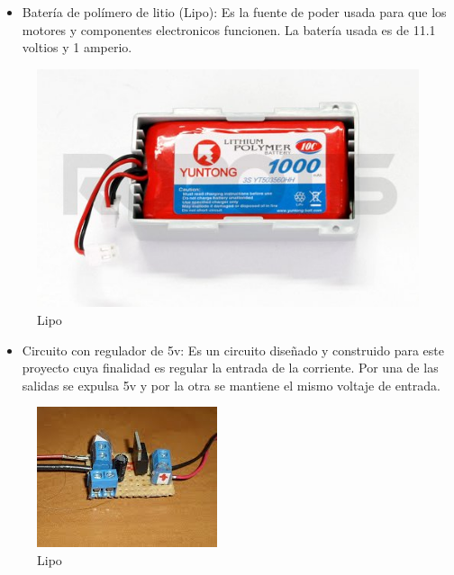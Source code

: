 \begin{itemize}
\item Batería de polímero de litio (Lipo): Es la fuente de poder usada para que los motores y componentes electronicos
funcionen. La batería usada es de 11.1 voltios y 1 amperio. \cite{bateria}
\end{itemize}


\begin{figure}[hbtp]
\centering
\includegraphics[scale=0.7]{imagenes/R-LIPOBAT.jpg}
\caption{Lipo}
\end{figure}

\begin{itemize}
\item Circuito con regulador de 5v: Es un circuito diseñado y construido para este proyecto cuya finalidad es regular la 
entrada de la corriente. Por una de las salidas se expulsa 5v y por la otra se mantiene el mismo voltaje de entrada. 
\end{itemize}

\begin{figure}[hbtp]
\centering
\includegraphics[scale=0.7]{imagenes/circuito.jpg}
\caption{Lipo}
\end{figure}



